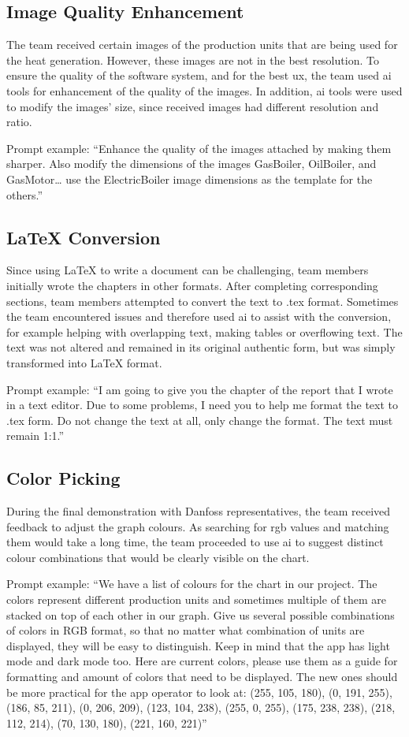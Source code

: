 \subsection{Image Quality Enhancement}
The team received certain images of the production units that are being used for the heat generation. However, these images are not in the best resolution. To ensure the quality of the software system, and for the best \acrfull{ux}, the team used \acrshort{ai} tools for enhancement of the quality of the images. In addition, \acrshort{ai} tools were used to modify the images’ size, since received images had different resolution and ratio.

Prompt example: ``Enhance the quality of the images attached by making them sharper. Also modify the dimensions of the images GasBoiler, OilBoiler, and GasMotor… use the ElectricBoiler image dimensions as the template for the others.''

\subsection{LaTeX Conversion}
Since using LaTeX to write a document can be challenging, team members initially wrote the chapters in other formats. After completing corresponding sections, team members attempted to convert the text to .tex format. Sometimes the team encountered issues and therefore used \acrshort{ai} to assist with the conversion, for example helping with overlapping text, making tables or overflowing text. The text was not altered and remained in its original authentic form, but was simply transformed into LaTeX format.

Prompt example: ``I am going to give you the chapter of the report that I wrote in a text editor. Due to some problems, I need you to help me format the text to .tex form. Do not change the text at all, only change the format. The text must remain 1:1.''

\subsection{Color Picking}
During the final demonstration with Danfoss representatives, the team received feedback to adjust the graph colours. As searching for \acrshort{rgb} values and matching them would take a long time, the team proceeded to use \acrshort{ai} to suggest distinct colour combinations that would be clearly visible on the chart.

Prompt example: ``We have a list of colours for the chart in our project. The colors represent different production units and sometimes multiple of them are stacked on top of each other in our graph. Give us several possible combinations of colors in RGB format, so that no matter what combination of units are displayed, they will be easy to distinguish. Keep in mind that the app has light mode and dark mode too. Here are current colors, please use them as a guide for formatting and amount of colors that need to be displayed. The new ones should be more practical for the app operator to look at: (255, 105, 180), (0, 191, 255), (186, 85, 211), (0, 206, 209), (123, 104, 238), (255, 0, 255), (175, 238, 238), (218, 112, 214), (70, 130, 180), (221, 160, 221)''

